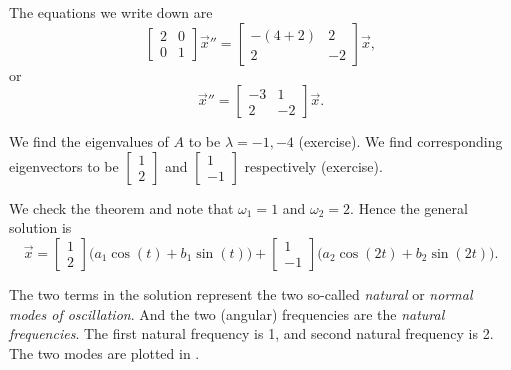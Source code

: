 \documentclass{ximera}
\begin{document}
\begin{exampleSol}
    The equations we write down are
    \begin{equation*}
        \begin{bmatrix}
            2 & 0 \\
            0 & 1
        \end{bmatrix}
        {\vec{x}}'' =
        \begin{bmatrix}
            -(4+2) & 2 \\
            2 & -2
        \end{bmatrix}
        \vec{x} ,
    \end{equation*}
    or
    \begin{equation*}
        {\vec{x}}'' =
        \begin{bmatrix}
            -3 & 1 \\
            2 & -2
        \end{bmatrix}
        \vec{x} .
    \end{equation*}
    
    We find the eigenvalues of $A$ to be $\lambda = -1, -4$ (exercise). We find corresponding eigenvectors to be $\left[ \begin{smallmatrix} 1 \\ 2 \end{smallmatrix} \right]$ and $\left[ \begin{smallmatrix} 1 \\ -1 \end{smallmatrix} \right]$ respectively (exercise).
    
    We check the theorem and note that $\omega_1 = 1$ and $\omega_2 = 2$. Hence the general solution is
    \begin{equation*}
        \vec{x} = 
        \begin{bmatrix} 
            1 \\ 
            2 
        \end{bmatrix}
        \bigl( a_1 \cos (t) + b_1 \sin (t) \bigr) +
        \begin{bmatrix} 
            1 \\ 
            -1 
        \end{bmatrix}
        \bigl( a_2 \cos (2t) + b_2 \sin (2t) \bigr) .
    \end{equation*}
    
    The two terms in the solution represent the two so-called \emph{natural} or \emph{normal modes of oscillation}. And the two (angular) frequencies are the \emph{natural frequencies}. The first natural frequency is 1, and second natural frequency is 2. The two modes are plotted in .
    

\end{exampleSol}
\end{document}
